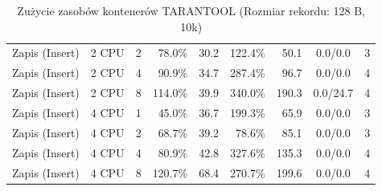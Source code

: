 \begin{table}[ht]
{\begin{tabular}{llcrrrrcc}
Zapis (Insert) & 2 CPU & 2 & 78.0\% & 30.2 & 122.4\% & 50.1 & 0.0/0.0 & 3 \\
Zapis (Insert) & 2 CPU & 4 & 90.9\% & 34.7 & 287.4\% & 96.7 & 0.0/0.0 & 4 \\
Zapis (Insert) & 2 CPU & 8 & 114.0\% & 39.9 & 340.0\% & 190.3 & 0.0/24.7 & 4 \\
Zapis (Insert) & 4 CPU & 1 & 45.0\% & 36.7 & 199.3\% & 65.9 & 0.0/0.0 & 3 \\
Zapis (Insert) & 4 CPU & 2 & 68.7\% & 39.2 & 78.6\% & 85.1 & 0.0/0.0 & 3 \\
Zapis (Insert) & 4 CPU & 4 & 80.9\% & 42.8 & 327.6\% & 135.3 & 0.0/0.0 & 4 \\
Zapis (Insert) & 4 CPU & 8 & 120.7\% & 68.4 & 270.7\% & 199.6 & 0.0/0.0 & 4 \\
\bottomrule
\end{tabular}%
}
\caption{Zużycie zasobów kontenerów TARANTOOL (Rozmiar rekordu: 128 B, 10k)}
\label{tab:resources_tarantool_small_10000}
\end{table}
